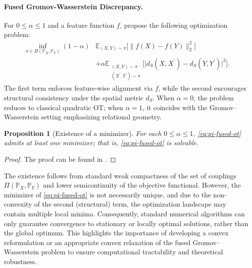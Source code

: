 \documentclass{article}
\newtheorem{proposition}{Proposition}
\begin{document}
\paragraph{Fused Gromov-Wasserstein Discrepancy.}
For $0\le \alpha\le 1$ and a feature function $f$, \citet{vayer2020fused} propose the following optimization problem:
\begin{align}
	\label{eq:pi-fused-ot}
	\inf_{\pi\in\Pi(\mathbb{P}_X,\mathbb{P}_Y)} 
	(1-\alpha)&\mathbb{E}_{(X,Y)\sim\pi}\big[\|f(X)-f(Y)\|_2^2\big] \nonumber\\
	&+ \alpha\mathbb{E}_{\substack{(X,Y)\sim\pi\\(X^\prime,Y^\prime)\sim\pi}}
	\Big[\big|d_S(X,X^\prime)-d_S(Y,Y^\prime)\big|^2\Big] .
\end{align}
The first term enforces feature-wise alignment via $f$, while the second encourages structural consistency under the spatial metric $d_S$. When $\alpha = 0$, the problem reduces to classical quadratic OT; when $\alpha = 1$, it coincides with the Gromov–Wasserstein setting emphasizing relational geometry.
\begin{proposition}[Existence of a minimizer]
	\label{prop:existence}
	For each $0\leq \alpha \leq 1$, \eqref{eq:pi-fused-ot} admits at least one minimizer; that is, \eqref{eq:pi-fused-ot} is solvable.
\end{proposition}
\begin{proof}
	The proof can be found in \citet{vayer2020fused}.
\end{proof}
The existence follows from standard weak compactness of the set of couplings $\Pi(\mathbb{P}_X,\mathbb{P}_Y)$ and lower semicontinuity of the objective functional. However, the minimizer of \eqref{eq:pi-fused-ot} is not necessarily unique, and due to the non-convexity of the second (structural) term, the optimization landscape may contain multiple local minima. Consequently, standard numerical algorithms can only guarantee convergence to stationary or locally optimal solutions, rather than the global optimum. This highlights the importance of developing a convex reformulation or an appropriate convex relaxation of the fused Gromov–Wasserstein problem to ensure computational tractability and theoretical robustness.

\end{document}
